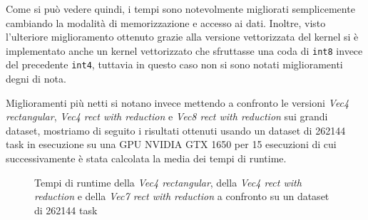 \documentclass[../relazione.tex]{subfiles}
\begin{document}
Come si può vedere quindi, i tempi sono notevolmente migliorati semplicemente cambiando la modalità di memorizzazione e accesso ai dati.
Inoltre, visto l'ulteriore miglioramento ottenuto grazie alla versione vettorizzata del kernel si è implementato anche un kernel vettorizzato che sfruttasse una coda di \lstinline{int8} invece del precedente \lstinline{int4}, tuttavia in questo caso non si sono notati miglioramenti degni di nota.

Miglioramenti più netti si notano invece mettendo a confronto le versioni \textit{Vec4 rectangular}, \textit{Vec4 rect with reduction} e \textit{Vec8 rect with reduction} sui grandi dataset, mostriamo di seguito i risultati ottenuti usando un dataset di 262144 task in esecuzione su una GPU NVIDIA GTX 1650 per 15 esecuzioni di cui successivamente è stata calcolata la media dei tempi di runtime.\\

\begin{figure}[H]
\caption{Tempi di runtime della \textit{Vec4 rectangular}, della \textit{Vec4 rect with reduction} e della \textit{Vec7 rect with reduction} a confronto su un dataset di 262144 task} \label{fig:M2}
\end{figure}
\end{document}

